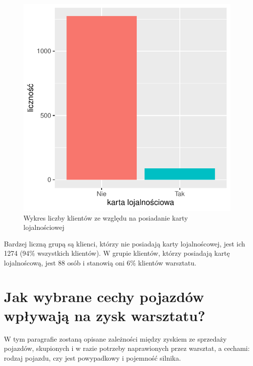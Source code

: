 \documentclass{article}\usepackage[]{graphicx}\usepackage[]{xcolor}
\makeatletter
\def\maxwidth{ %
  \ifdim\Gin@nat@width>\linewidth
    \linewidth
  \else
    \Gin@nat@width
  \fi
}
\newenvironment{knitrout}{}{} %
\makeatother
\begin{document}
\begin{knitrout}
\color{fgcolor}\begin{figure}[H]

{\centering \includegraphics[width=\maxwidth]{figure/fig_karta-1} 

}

\caption[Wykres liczby klientów ze względu na posiadanie karty lojalnościowej]{Wykres liczby klientów ze względu na posiadanie karty lojalnościowej}\label{fig:fig_karta}
\end{figure}

\end{knitrout}

Bardzej liczną grupą są klienci, którzy nie posiadają karty lojalnoścowej, jest ich 1274 (94\% wszystkich klientów). W grupie klientów, którzy posiadają kartę lojalnoścową, jest 88 osób i stanowią oni 6\% klientów warsztatu.

\section{Jak wybrane cechy pojazdów wpływają na zysk warsztatu?}

W tym paragrafie zostaną opisane zależności między zyskiem ze sprzedaży pojazdów, skupionych i w razie potrzeby naprawionych przez warsztat, a cechami: rodzaj pojazdu, czy jest powypadkowy i pojemność silnika.
\end{document}
